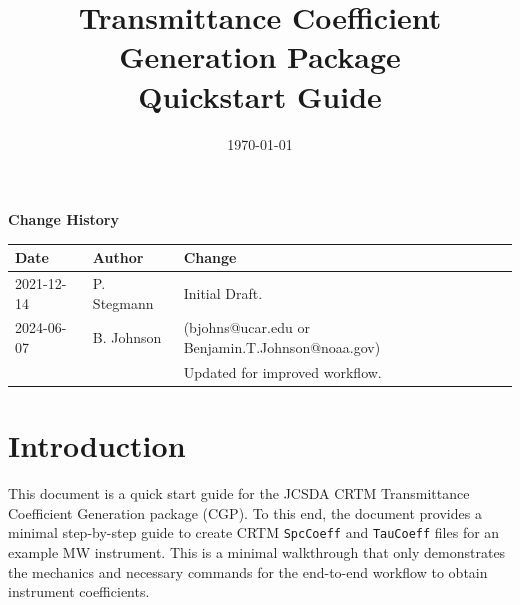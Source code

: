 

\title{Transmittance Coefficient Generation Package\\ \normalsize{Quickstart Guide}}
\date{\today}




\maketitle


\tableofcontents

\newpage

\thispagestyle{empty}
\vspace*{10cm}
\begin{center}
  {\sffamily\Large\bfseries Change History}
  \begin{table}[htp]
    \centering
    \begin{tabular}{l l l}
      \hline
      \sffamily\textbf{Date} & \sffamily\textbf{Author} & \sffamily\textbf{Change}\\
      \hline\hline
      2021-12-14 & P. Stegmann& Initial Draft.\\
      2024-06-07 & B. Johnson & (bjohns@ucar.edu or Benjamin.T.Johnson@noaa.gov) \\
       & & Updated for improved workflow.\\
      \hline
    \end{tabular}
  \end{table}
\end{center}
\clearpage
{}
\setcounter{page}{1}


%

\section{Introduction}
This document is a quick start guide for the JCSDA CRTM Transmittance Coefficient Generation package (CGP).
To this end, the document provides a minimal step-by-step guide to create CRTM \verb|SpcCoeff| and \verb|TauCoeff| files for an example MW instrument. 
This is a minimal walkthrough that only demonstrates the mechanics and necessary commands for the end-to-end workflow to obtain instrument coefficients.

